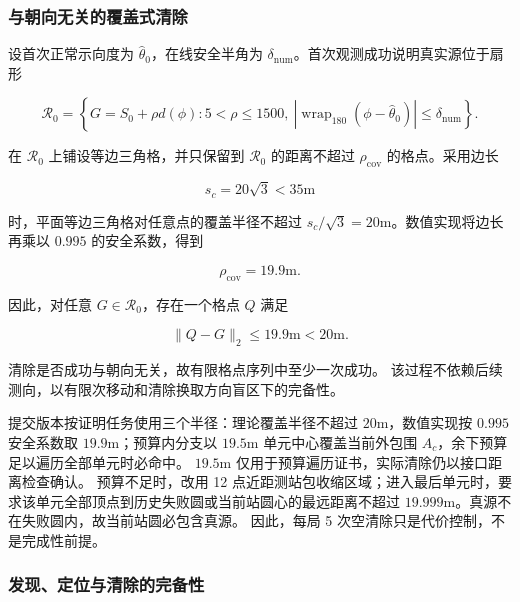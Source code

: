 \subsubsection{与朝向无关的覆盖式清除}

设首次正常示向度为 $\hat\theta_0$，在线安全半角为 $\delta_{\mathrm{num}}$。首次观测成功说明真实源位于扇形

\begin{equation}
\mathcal R_0=
\left\{
G=S_0+\rho d(\phi):
5<\rho\le1500,\ 
\left|\operatorname{wrap}_{180}(\phi-\hat\theta_0)\right|
\le\delta_{\mathrm{num}}
\right\}.
\label{eq:q4_first_sector}
\end{equation}

在 $\mathcal R_0$ 上铺设等边三角格，并只保留到 $\mathcal R_0$ 的距离不超过 $\rho_{\mathrm{cov}}$ 的格点。采用边长

\begin{equation}
s_c=20\sqrt{3}<35\mathrm{m}
\label{eq:q4_clear_spacing}
\end{equation}

时，平面等边三角格对任意点的覆盖半径不超过 $s_c/\sqrt3=20\mathrm{m}$。数值实现将边长再乘以 $0.995$ 的安全系数，得到

\begin{equation}
\rho_{\mathrm{cov}}=19.9\mathrm{m}.
\label{eq:q4_clear_cover_radius}
\end{equation}

因此，对任意 $G\in\mathcal R_0$，存在一个格点 $Q$ 满足

\begin{equation}
\lVert Q-G\rVert_2\le19.9\mathrm{m}<20\mathrm{m}.
\label{eq:q4_clear_guarantee}
\end{equation}

清除是否成功与朝向无关，故有限格点序列中至少一次成功。
该过程不依赖后续测向，以有限次移动和清除换取方向盲区下的完备性。

提交版本按证明任务使用三个半径：理论覆盖半径不超过 $20\mathrm{m}$，数值实现按 $0.995$ 安全系数取 $19.9\mathrm{m}$；预算内分支以 $19.5\mathrm{m}$ 单元中心覆盖当前外包围 $A_c$，余下预算足以遍历全部单元时必命中。
$19.5\mathrm{m}$ 仅用于预算遍历证书，实际清除仍以接口距离检查确认。
预算不足时，改用 12 点近距测站包收缩区域；进入最后单元时，要求该单元全部顶点到历史失败圆或当前站圆心的最远距离不超过 $19.999\mathrm{m}$。真源不在失败圆内，故当前站圆必包含真源。
因此，每局 5 次空清除只是代价控制，不是完成性前提。

\subsubsection{发现、定位与清除的完备性}

